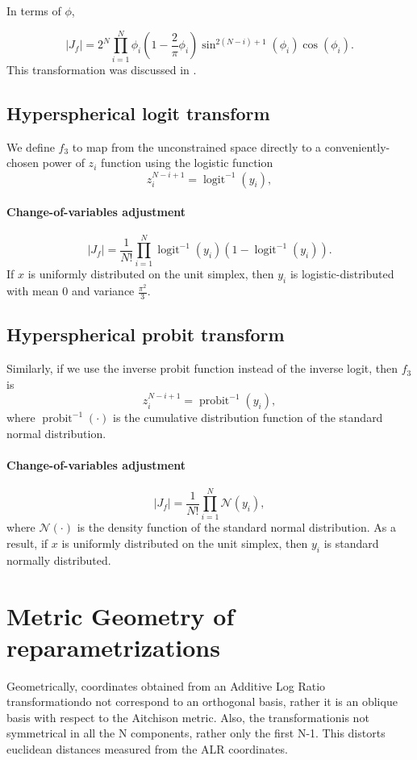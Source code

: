 \documentclass[11pt]{article}
\begin{document}
In terms of $\phi$,

$$
|J_f| = 2^N \prod_{i=1}^N \phi_i \left(1 - \frac{2}{\pi} \phi_i\right) \sin^{2(N-i)+1}(\phi_i) \cos(\phi_i).
$$
This transformation was discussed in \cite{betancourt2012cruising}.

\subsection{Hyperspherical logit transform}

We define $f_3$ to map from the unconstrained space directly to a conveniently-chosen power of $z_i$ function using the logistic function 
$$z_i^{N-i+1} = \operatorname{logit}^{-1} (y_i),$$
\paragraph{Change-of-variables adjustment}
$$
|J_f| = \frac{1}{N!} \prod_{i=1}^N \operatorname{logit}^{-1}(y_i) (1 - \operatorname{logit}^{-1}(y_i)).
$$
If $x$ is uniformly distributed on the unit simplex, then $y_i$ is logistic-distributed with mean 0 and variance $\frac{\pi^2}{3}$.

\subsection{Hyperspherical probit transform}

Similarly, if we use the inverse probit function instead of the inverse logit, then $f_3$ is
$$z_i^{N-i+1} = \operatorname{probit}^{-1} (y_i),$$
where $\operatorname{probit}^{-1}(\cdot)$ is the cumulative distribution function of the standard normal distribution.
\paragraph{Change-of-variables adjustment}

\[
|J_f| = \frac{1}{N!} \prod_{i=1}^N \mathcal{N}(y_i),
\]
where $\mathcal{N}(\cdot)$ is the density function of the standard normal distribution.
As a result, if $x$ is uniformly distributed on the unit simplex, then $y_i$ is standard normally distributed.

\section{Metric Geometry of reparametrizations}

Geometrically, coordinates obtained from an Additive Log Ratio transformationdo not correspond to an orthogonal basis, rather it is an oblique basis with respect to the Aitchison metric. Also, the transformationis not symmetrical in all the N components, rather only the first N-1. This distorts euclidean distances measured from the ALR coordinates.
\end{document}
